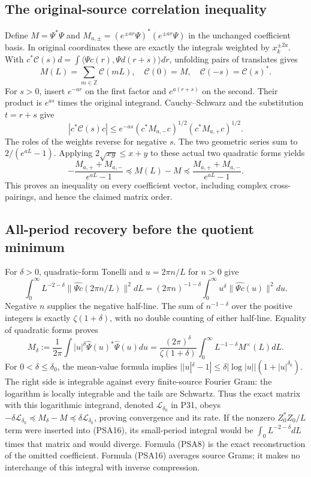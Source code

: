 \subsection{The original-source correlation inequality}

Define $M=\Psi^*\Psi$ and
$M_{a,\pm}=(e^{\pm ar}\Psi)^*(e^{\pm ar}\Psi)$ in the unchanged
coefficient basis. In original coordinates these are exactly the
integrals weighted by $x_k^{\pm2a}$. With
$c^*\mathcal C(s)d=\int\langle\Psi c(r),\Psi d(r+s)\rangle dr$,
unfolding pairs of translates gives
\[
 M(L)=\sum_{m\in\mathbb Z}\mathcal C(mL),\quad
 \mathcal C(0)=M,\quad\mathcal C(-s)=\mathcal C(s)^*.
 \tag{PSA12}
\]
For $s>0$, insert $e^{-ar}$ on the first factor and $e^{a(r+s)}$
on the second. Their product is $e^{as}$ times the original integrand.
Cauchy--Schwarz and the substitution $t=r+s$ give
\[
 |c^*\mathcal C(s)c|
 \le e^{-as}(c^*M_{a,-}c)^{1/2}(c^*M_{a,+}c)^{1/2}.
 \tag{PSA13}
\]
The roles of the weights reverse for negative $s$. The two geometric
series sum to $2/(e^{aL}-1)$. Applying
$2\sqrt{xy}\le x+y$ to these actual two quadratic forms yields
\[
 -\frac{M_{a,+}+M_{a,-}}{e^{aL}-1}
 \preceq M(L)-M\preceq
 \frac{M_{a,+}+M_{a,-}}{e^{aL}-1}.
 \tag{PSA14}
\]
This proves an inequality on every coefficient vector, including
complex cross-pairings, and hence the claimed matrix order.

\subsection{All-period recovery before the quotient minimum}

For $\delta>0$, quadratic-form Tonelli and
$u=2\pi n/L$ for $n>0$ give
\[
 \int_0^\infty L^{-2-\delta}
       \|\widehat{\Psi c}(2\pi n/L)\|^2dL
 =(2\pi n)^{-1-\delta}\int_0^\infty
       u^\delta\|\widehat{\Psi c}(u)\|^2du.
 \tag{PSA15}
\]
Negative $n$ supplies the negative half-line. The sum of
$n^{-1-\delta}$ over the positive integers is exactly
$\zeta(1+\delta)$, with no double counting of either half-line.
Equality of quadratic forms proves
\[
 M_\delta:=\frac1{2\pi}\int|u|^\delta
       \widehat\Psi(u)^*\widehat\Psi(u)du
 =\frac{(2\pi)^\delta}{\zeta(1+\delta)}
       \int_0^\infty L^{-1-\delta}M^\times(L)dL.
 \tag{PSA16}
\]
For $0<\delta\le\delta_0$, the mean-value formula implies
$||u|^\delta-1|\le\delta|\log|u||
(1+|u|^{\delta_0})$. The right side is integrable against every
finite-source Fourier Gram: the logarithm is locally integrable and
the tails are Schwartz. Thus the exact matrix with this logarithmic
integrand, denoted $\mathcal L_{\delta_0}$ in P31, obeys
$-\delta\mathcal L_{\delta_0}\preceq M_\delta-M
\preceq\delta\mathcal L_{\delta_0}$, proving convergence and its rate.
If the nonzero $Z_0^*Z_0/L$ term were inserted into (PSA16), its
small-period integral would be $\int_0 L^{-2-\delta}dL$ times that
matrix and would diverge. Formula (PSA8) is the exact reconstruction
of the omitted coefficient. Formula (PSA16) averages source Grams;
it makes no interchange of this integral with inverse compression.


